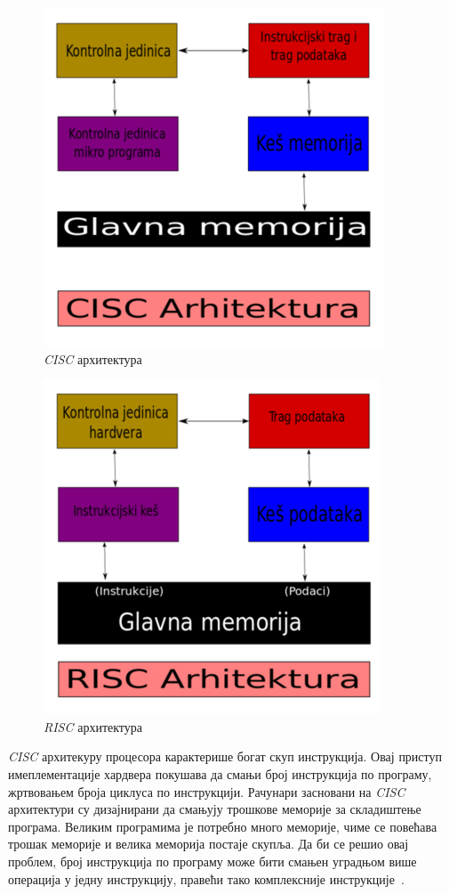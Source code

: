 \documentclass[12pt,oneside]{memoir}
\begin{document}
\begin{figure}[h!]
\begin{center}
\includegraphics[scale=0.75]{cisc.png}
\end{center}
\caption{\textit{CISC} архитектура}
\label{fig:main}
\end{figure}

\begin{figure}[h!]
\begin{center}
\includegraphics[scale=0.75]{risc.png}
\end{center}
\caption{\textit{RISC} архитектура}
\label{fig:main}
\end{figure}

\indent \textit{CISC} архитекуру процесора карактерише богат скуп инструкција. Овај приступ имеплементације хардвера покушава да смањи број инструкција по програму, жртвовањем броја циклуса по инструкцији. Рачунари засновани на \textit{CISC} архитектури су дизајнирани да смањују трошкове меморије за складиштење програма. Великим програмима је потребно много меморије, чиме се повећава трошак меморије и велика меморија постаје скупља. Да би се решио овај проблем, број инструкција по програму може бити смањен уградњом више операција у једну инструкцију, правећи тако комплексније инструкције~\cite{rcRef}.
\end{document}
